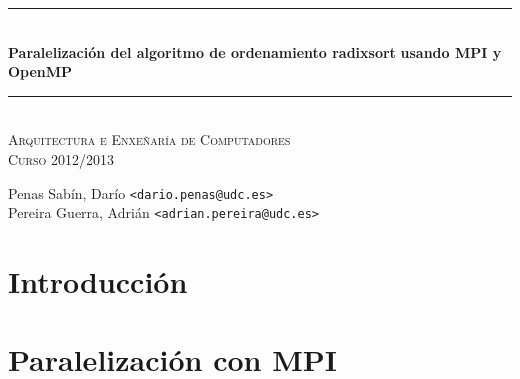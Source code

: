 \documentclass[a4paper]{article}
\newcommand{\HRule}{\rule{\linewidth}{0.5mm}}
\begin{document}
		\begin{center}

			\HRule \\[0.4cm]
			{ \huge \bfseries Paralelización del algoritmo de ordenamiento radixsort}
      \vspace{0.2cm}
      { \huge \bfseries usando MPI y OpenMP}\\[0.4cm]
			\HRule \\[0cm]

			\vspace{1cm}
			\textsc{\Large Arquitectura e Enxeñaría de Computadores}\\[0.5cm]
			\textsc{\Large Curso 2012/2013}\\[0.5cm]

		\end{center}


		\vspace{2cm}

		\begin{center}
		Penas Sabín, Darío \texttt{<dario.penas@udc.es>}\\
		\vspace{0.1cm}
		Pereira Guerra, Adrián \texttt{<adrian.pereira@udc.es>}\\		
		\end{center}
		\vspace{2cm}


\tableofcontents
\vspace{3cm}
\clearpage

\section{Introducción}
  	
\section{Paralelización con MPI}
	
%	
%	
%	
\clearpage
\appendix
\end{document}
